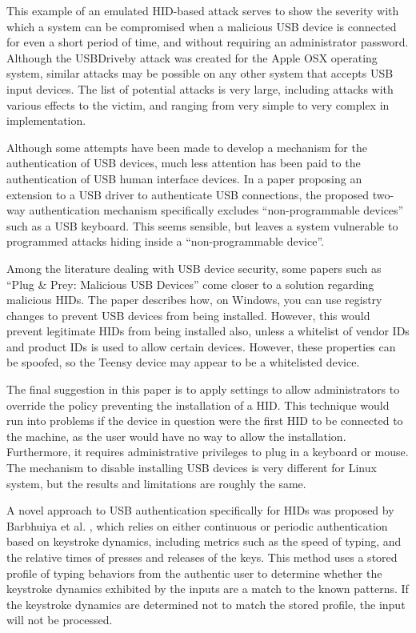 \documentclass[pagenumbers]{ieee}
\begin{document}
This example of an emulated HID-based attack serves to show the severity with which a system can be compromised when a malicious USB device is connected for even a short period of time, and without requiring an administrator password. Although the USBDriveby attack was created for the Apple OSX operating system, similar attacks may be possible on any other system that accepts USB input devices. The list of potential attacks is very large, including attacks with various effects to the victim, and ranging from very simple to very complex in implementation.

Although some attempts have been made to develop a mechanism for the authentication of USB devices, much less attention has been paid to the authentication of USB human interface devices. In a paper \cite{wang} proposing an extension to a USB driver to authenticate USB connections, the proposed two-way authentication mechanism specifically excludes ``non-programmable devices'' such as a USB keyboard. This seems sensible, but leaves a system vulnerable to programmed attacks hiding inside a ``non-programmable device''.

Among the literature dealing with USB device security, some papers such as ``Plug \& Prey: Malicious USB Devices'' \cite{crenshaw} come closer to a solution regarding malicious HIDs. The paper describes how, on Windows, you can use registry changes to prevent USB devices from being installed. However, this would prevent legitimate HIDs from being installed also, unless a whitelist of vendor IDs and product IDs is used to allow certain devices. However, these properties can be spoofed, so the Teensy device may appear to be a whitelisted device.

The final suggestion in this paper is to apply settings to allow administrators to override the policy preventing the installation of a HID. This technique would run into problems if the device in question were the first HID to be connected to the machine, as the user would have no way to allow the installation. Furthermore, it requires administrative privileges to plug in a keyboard or mouse. The mechanism to disable installing USB devices is very different for Linux system, but the results and limitations are roughly the same.

A novel approach to USB authentication specifically for HIDs was proposed by Barbhuiya et al. \cite{barbhuiya}, which relies on either continuous or periodic authentication based on keystroke dynamics, including metrics such as the speed of typing, and the relative times of presses and releases of the keys. This method uses a stored profile of typing behaviors from the authentic user to determine whether the keystroke dynamics exhibited by the inputs are a match to the known patterns. If the keystroke dynamics are determined not to match the stored profile, the input will not be processed.
\end{document}
